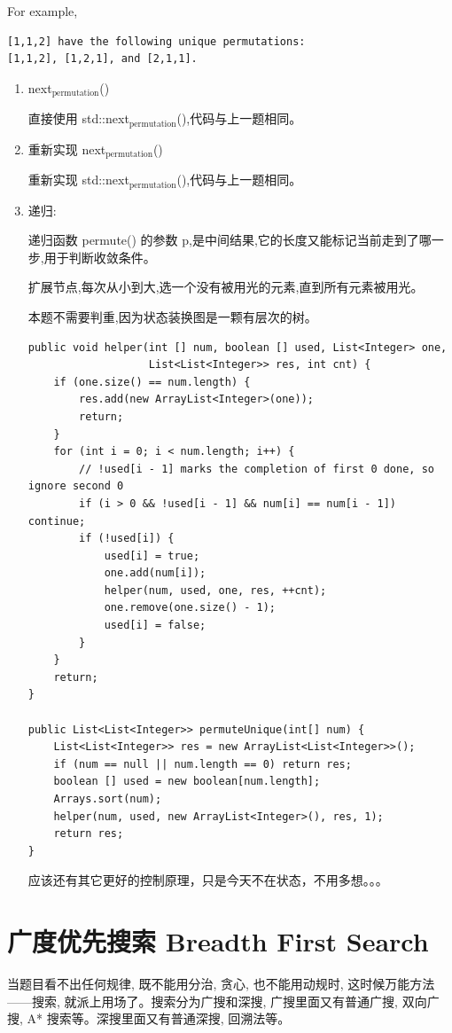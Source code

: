 \documentclass[12pt]{book}
\begin{document}
For example,
\lstset{language=java,label= ,caption= ,numbers=none}
\begin{lstlisting}
[1,1,2] have the following unique permutations:
[1,1,2], [1,2,1], and [2,1,1].
\end{lstlisting}

\begin{enumerate}
\item next$_{\text{permutation}}$()
\label{sec-9-2-1-1}

直接使用 std::next$_{\text{permutation}}$(),代码与上一题相同。
\item 重新实现 next$_{\text{permutation}}$()
\label{sec-9-2-1-2}

重新实现 std::next$_{\text{permutation}}$(),代码与上一题相同。
\item 递归:
\label{sec-9-2-1-3}

递归函数 permute() 的参数 p,是中间结果,它的长度又能标记当前走到了哪一步,用于判断收敛条件。

扩展节点,每次从小到大,选一个没有被用光的元素,直到所有元素被用光。

本题不需要判重,因为状态装换图是一颗有层次的树。

\lstset{language=java,label= ,caption= ,numbers=none}
\begin{lstlisting}
public void helper(int [] num, boolean [] used, List<Integer> one,
                   List<List<Integer>> res, int cnt) {
    if (one.size() == num.length) {
        res.add(new ArrayList<Integer>(one));
        return;
    }
    for (int i = 0; i < num.length; i++) {
        // !used[i - 1] marks the completion of first 0 done, so ignore second 0
        if (i > 0 && !used[i - 1] && num[i] == num[i - 1]) continue;
        if (!used[i]) {
            used[i] = true;
            one.add(num[i]);
            helper(num, used, one, res, ++cnt);
            one.remove(one.size() - 1);
            used[i] = false;
        }
    }
    return;
}
        
public List<List<Integer>> permuteUnique(int[] num) {
    List<List<Integer>> res = new ArrayList<List<Integer>>();
    if (num == null || num.length == 0) return res;
    boolean [] used = new boolean[num.length];
    Arrays.sort(num);
    helper(num, used, new ArrayList<Integer>(), res, 1);
    return res;
}
\end{lstlisting}

应该还有其它更好的控制原理，只是今天不在状态，不用多想。。。
\end{enumerate}

\chapter{广度优先搜索 Breadth First Search}
\label{sec-10}
当题目看不出任何规律, 既不能用分治, 贪心, 也不能用动规时, 这时候万能方法——搜索, 就派上用场了。搜索分为广搜和深搜, 广搜里面又有普通广搜, 双向广搜, A* 搜索等。深搜里面又有普通深搜, 回溯法等。
\end{document}
